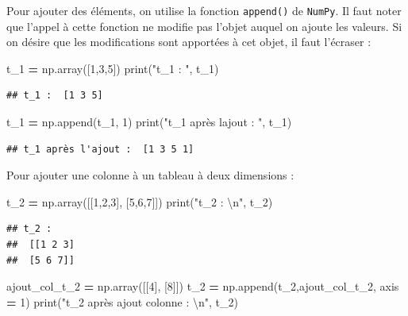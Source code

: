 \documentclass[
  12pt,
]{book}
\newenvironment{Shaded}{\begin{snugshade}}{\end{snugshade}}
\newcommand{\BuiltInTok}[1]{#1}
\newcommand{\CharTok}[1]{\textcolor[rgb]{0.31,0.60,0.02}{#1}}
\newcommand{\DecValTok}[1]{\textcolor[rgb]{0.00,0.00,0.81}{#1}}
\newcommand{\NormalTok}[1]{#1}
\newcommand{\OperatorTok}[1]{\textcolor[rgb]{0.81,0.36,0.00}{\textbf{#1}}}
\newcommand{\StringTok}[1]{\textcolor[rgb]{0.31,0.60,0.02}{#1}}
\numberwithin{equation}{section}
\numberwithin{countremarque}{section}
\begin{document}
Pour ajouter des éléments, on utilise la fonction \texttt{append()} de \texttt{NumPy}. Il faut noter que l'appel à cette fonction ne modifie pas l'objet auquel on ajoute les valeurs. Si on désire que les modifications sont apportées à cet objet, il faut l'écraser :

\begin{Shaded}
\begin{Highlighting}[]
\NormalTok{t\_1 }\OperatorTok{=}\NormalTok{ np.array([}\DecValTok{1}\NormalTok{,}\DecValTok{3}\NormalTok{,}\DecValTok{5}\NormalTok{])}
\BuiltInTok{print}\NormalTok{(}\StringTok{"t\_1 : "}\NormalTok{, t\_1)}
\end{Highlighting}
\end{Shaded}

\begin{lstlisting}
## t_1 :  [1 3 5]
\end{lstlisting}

\begin{Shaded}
\begin{Highlighting}[]
\NormalTok{t\_1 }\OperatorTok{=}\NormalTok{ np.append(t\_1, }\DecValTok{1}\NormalTok{)}
\BuiltInTok{print}\NormalTok{(}\StringTok{"t\_1 après l\textquotesingle{}ajout : "}\NormalTok{, t\_1)}
\end{Highlighting}
\end{Shaded}

\begin{lstlisting}
## t_1 après l'ajout :  [1 3 5 1]
\end{lstlisting}

Pour ajouter une colonne à un tableau à deux dimensions :

\begin{Shaded}
\begin{Highlighting}[]
\NormalTok{t\_2 }\OperatorTok{=}\NormalTok{ np.array([[}\DecValTok{1}\NormalTok{,}\DecValTok{2}\NormalTok{,}\DecValTok{3}\NormalTok{], [}\DecValTok{5}\NormalTok{,}\DecValTok{6}\NormalTok{,}\DecValTok{7}\NormalTok{]])}
\BuiltInTok{print}\NormalTok{(}\StringTok{"t\_2 : }\CharTok{\textbackslash{}n}\StringTok{"}\NormalTok{, t\_2)}
\end{Highlighting}
\end{Shaded}

\begin{lstlisting}
## t_2 : 
##  [[1 2 3]
##  [5 6 7]]
\end{lstlisting}

\begin{Shaded}
\begin{Highlighting}[]
\NormalTok{ajout\_col\_t\_2 }\OperatorTok{=}\NormalTok{ np.array([[}\DecValTok{4}\NormalTok{], [}\DecValTok{8}\NormalTok{]])}
\NormalTok{t\_2 }\OperatorTok{=}\NormalTok{ np.append(t\_2,ajout\_col\_t\_2, axis }\OperatorTok{=} \DecValTok{1}\NormalTok{)}
\BuiltInTok{print}\NormalTok{(}\StringTok{"t\_2 après ajout colonne : }\CharTok{\textbackslash{}n}\StringTok{"}\NormalTok{, t\_2)}
\end{Highlighting}
\end{Shaded}
\end{document}
